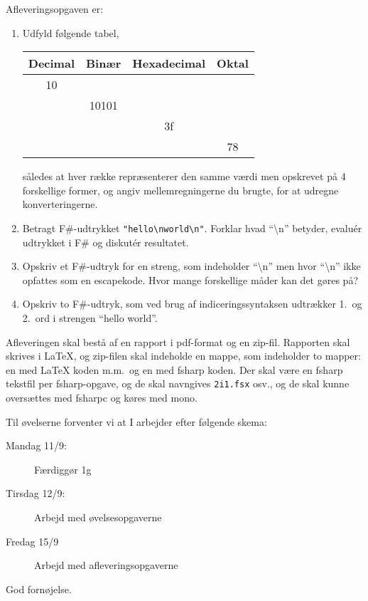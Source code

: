 \documentclass[a4paper,12pt]{article}
\begin{document}
Afleveringsopgaven er:
\begin{enumerate}[label=2i.\arabic*,start=0]
\item Udfyld følgende tabel,
  \begin{center}
    \begin{tabular}{|c|c|c|c|}
      \hline
      Decimal & Binær & Hexadecimal & Oktal\\
      \hline
              10 &  &  & \\
      \hline
              & 10101 &  & \\
      \hline
               &  & 3f  & \\
      \hline
              &  &  & 78 \\
      \hline
    \end{tabular}
  \end{center}
således at hver række repræsenterer den samme værdi men opskrevet på 4 forskellige former, og angiv mellemregningerne du brugte, for at udregne konverteringerne.
\item Betragt F\#-udtrykket \lstinline{"hello\nworld\n"}. Forklar hvad ``\textbackslash n'' betyder, evalu\'{e}r udtrykket i F\# og diskut\'{e}r resultatet.
\item Opskriv et F\#-udtryk for en streng, som indeholder ``\textbackslash n'' men hvor ``\textbackslash n'' ikke opfattes som en escapekode. Hvor mange forskellige måder kan det gøres på?
\item Opskriv to F\#-udtryk, som ved brug af indiceringssyntaksen udtrækker 1.\ og 2.\ ord i strengen ``hello world''.
\end{enumerate}
Afleveringen skal bestå af en rapport i pdf-format og en zip-fil. Rapporten skal skrives i LaTeX, og zip-filen skal indeholde en mappe, som indeholder to mapper: en med LaTeX koden m.m.\ og en med fsharp koden. Der skal være en fsharp tekstfil per fsharp-opgave, og de skal navngives \verb|2i1.fsx| osv., og de skal kunne oversættes med fsharpc og køres med mono.

Til øvelserne forventer vi at I arbejder efter følgende skema:
\begin{description}
\item[Mandag 11/9:] Færdiggør 1g
\item[Tirsdag 12/9:] Arbejd med øvelsesopgaverne
\item[Fredag 15/9]  Arbejd med afleveringsopgaverne
\end{description}


\flushright God fornøjelse.
\end{document}
